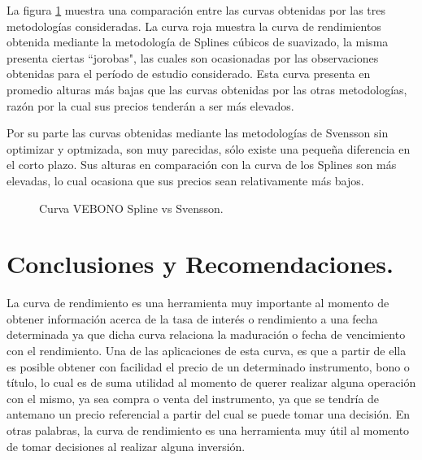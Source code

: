 \hspace{0.4cm} La figura \ref{curva_spline_comp_veb} muestra una comparaci\'on entre las curvas obtenidas por las tres metodolog\'ias consideradas. La curva roja muestra la curva de rendimientos obtenida mediante la metodolog\'ia de Splines c\'ubicos de suavizado, la misma presenta ciertas ``jorobas", las cuales son ocasionadas por las observaciones obtenidas para el per\'iodo de estudio considerado. Esta curva presenta en promedio alturas m\'as bajas que las curvas obtenidas por las otras metodolog\'ias, raz\'on por la cual sus precios tender\'an a ser m\'as elevados.

\hspace{0.4cm} Por su parte las curvas obtenidas mediante las metodolog\'ias de Svensson sin optimizar y optmizada, son muy parecidas, s\'olo existe una peque\~na diferencia en el corto plazo. Sus alturas en comparaci\'on con la curva de los Splines son m\'as elevadas, lo cual ocasiona que sus precios sean relativamente m\'as bajos.

\newpage

\begin{figure}[h]
\caption{Curva VEBONO Spline vs Svensson.}
\label{curva_spline_comp_veb}
\end{figure}


\newpage

\section{Conclusiones y Recomendaciones.}

\hspace{0.4cm}La curva de rendimiento es una herramienta muy importante al momento de obtener informaci\'on acerca de la tasa de inter\'es o rendimiento a una fecha determinada ya que dicha curva relaciona la maduraci\'on o fecha de vencimiento con el rendimiento. Una de las aplicaciones de esta curva, es que a partir de ella es posible obtener con facilidad el precio de un determinado instrumento, bono o t\'itulo, lo cual es de suma utilidad al momento de querer realizar alguna operaci\'on con el mismo, ya sea compra o venta del instrumento, ya que se tendr\'ia de antemano un precio referencial a partir del cual se puede tomar una decisi\'on. En otras palabras, la curva de rendimiento es una herramienta muy \'util al momento de tomar decisiones al realizar alguna inversi\'on.



